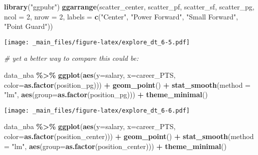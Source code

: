 \documentclass[
]{book}
\newenvironment{Shaded}{\begin{snugshade}}{\end{snugshade}}
\newcommand{\AttributeTok}[1]{\textcolor[rgb]{0.13,0.29,0.53}{#1}}
\newcommand{\CommentTok}[1]{\textcolor[rgb]{0.56,0.35,0.01}{\textit{#1}}}
\newcommand{\DecValTok}[1]{\textcolor[rgb]{0.00,0.00,0.81}{#1}}
\newcommand{\FunctionTok}[1]{\textcolor[rgb]{0.13,0.29,0.53}{\textbf{#1}}}
\newcommand{\NormalTok}[1]{#1}
\newcommand{\SpecialCharTok}[1]{\textcolor[rgb]{0.81,0.36,0.00}{\textbf{#1}}}
\newcommand{\StringTok}[1]{\textcolor[rgb]{0.31,0.60,0.02}{#1}}
\begin{document}
\begin{Shaded}
\begin{Highlighting}[]
\FunctionTok{library}\NormalTok{(}\StringTok{"ggpubr"}\NormalTok{)}
\FunctionTok{ggarrange}\NormalTok{(scatter\_center, scatter\_pf,}
\NormalTok{          scatter\_sf, scatter\_pg,}
          \AttributeTok{ncol =} \DecValTok{2}\NormalTok{, }\AttributeTok{nrow =} \DecValTok{2}\NormalTok{,}
          \AttributeTok{labels =} \FunctionTok{c}\NormalTok{(}\StringTok{"Center"}\NormalTok{,}
                     \StringTok{"Power Forward"}\NormalTok{,}
                     \StringTok{"Small Forward"}\NormalTok{,}
                     \StringTok{"Point Guard"}\NormalTok{))}
\end{Highlighting}
\end{Shaded}

\texttt{[image: \_main\_files/figure-latex/explore\_dt\_6-5.pdf]}

\begin{Shaded}
\begin{Highlighting}[]
\CommentTok{\# yet a better way to compare this could be:}

\NormalTok{data\_nba }\SpecialCharTok{\%\textgreater{}\%} 
  \FunctionTok{ggplot}\NormalTok{(}\FunctionTok{aes}\NormalTok{(}\AttributeTok{y=}\NormalTok{salary, }\AttributeTok{x=}\NormalTok{career\_PTS, }\AttributeTok{color=}\FunctionTok{as.factor}\NormalTok{(position\_pg))) }\SpecialCharTok{+}
    \FunctionTok{geom\_point}\NormalTok{() }\SpecialCharTok{+} 
     \FunctionTok{stat\_smooth}\NormalTok{(}\AttributeTok{method =} \StringTok{"lm"}\NormalTok{,}
                 \FunctionTok{aes}\NormalTok{(}\AttributeTok{group=}\FunctionTok{as.factor}\NormalTok{(position\_pg))) }\SpecialCharTok{+} 
       \FunctionTok{theme\_minimal}\NormalTok{()}
\end{Highlighting}
\end{Shaded}

\texttt{[image: \_main\_files/figure-latex/explore\_dt\_6-6.pdf]}

\begin{Shaded}
\begin{Highlighting}[]
\NormalTok{data\_nba }\SpecialCharTok{\%\textgreater{}\%} 
  \FunctionTok{ggplot}\NormalTok{(}\FunctionTok{aes}\NormalTok{(}\AttributeTok{y=}\NormalTok{salary, }\AttributeTok{x=}\NormalTok{career\_PTS, }\AttributeTok{color=}\FunctionTok{as.factor}\NormalTok{(position\_center))) }\SpecialCharTok{+}
    \FunctionTok{geom\_point}\NormalTok{() }\SpecialCharTok{+} 
     \FunctionTok{stat\_smooth}\NormalTok{(}\AttributeTok{method =} \StringTok{"lm"}\NormalTok{,}
                 \FunctionTok{aes}\NormalTok{(}\AttributeTok{group=}\FunctionTok{as.factor}\NormalTok{(position\_center))) }\SpecialCharTok{+} 
       \FunctionTok{theme\_minimal}\NormalTok{()}
\end{Highlighting}
\end{Shaded}
\end{document}
